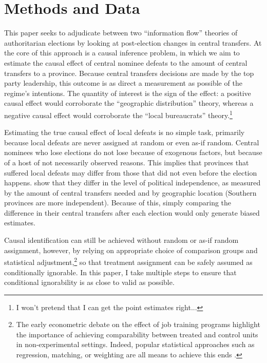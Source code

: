 \documentclass[12pt]{article}\usepackage[]{graphicx}\usepackage[]{color}
\newcommand{\1}{\mathbbm{1}}
\begin{document}
\section{Methods and Data}
\label{sec:methods}
This paper seeks to adjudicate between two ``information flow'' theories of authoritarian elections by looking at post-election changes in central transfers. At the core of this approach is a causal inference problem, in which we aim to estimate the causal effect of central nominee defeats to the amount of central transfers to a province. Because central transfers decisions are made by the top party leadership, this outcome is as direct a measurement as possible of the regime's intentions. The quantity of interest is the sign of the effect: a positive causal effect would corroborate the ``geographic distribution'' theory, whereas a negative causal effect would corroborate the ``local bureaucrats'' theory.\footnote{I won't pretend that I can get the point estimates right...}

Estimating the true causal effect of local defeats is no simple task, primarily because local defeats are never assigned at random or even as-if random. Central nominees who lose elections do not lose because of exogenous factors, but because of a host of not necessarily observed reasons. This implies that provinces that suffered local defeats may differ from those that did not even before the election happens. \cite{MaleskySchuler2011} show that they differ in the level of political independence, as measured by the amount of central transfers needed and by geographic location (Southern provinces are more independent). Because of this, simply comparing the difference in their central transfers after each election would only generate biased estimates.

Causal identification can still be achieved without random or as-if random assignment, however, by relying on appropriate choice of comparison groups and statistical adjustment,\footnote{The early econometric debate on the effect of job training programs highlight the importance of achieving comparability between treated and control units in non-experimental settings. Indeed, popular statistical approaches such as regression, matching, or weighting are all means to achieve this ends \citep{Ashenfelter1978, AshenfelterCard1985, Lalonde1986, DehejiaWahba1999}.} so that treatment assignment can be safely assumed as conditionally ignorable. In this paper, I take multiple steps to ensure that conditional ignorability is as close to valid as possible. 
\end{document}
